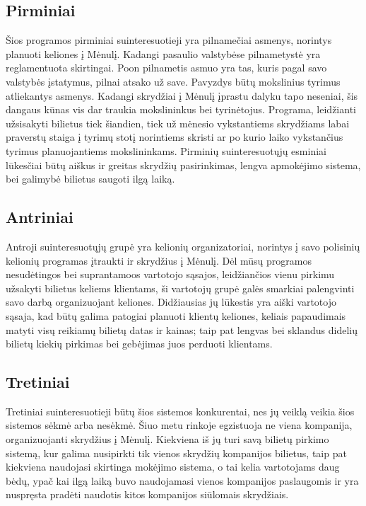 \documentclass{VUMIFPSkursinis}
\begin{document}
\subsection{Pirminiai} Šios programos pirminiai suinteresuotieji yra pilnamečiai asmenys, norintys planuoti keliones į Mėnulį. Kadangi pasaulio valstybėse pilnametystė yra reglamentuota skirtingai. Poon pilnametis asmuo yra tas, kuris pagal savo valstybės įstatymus, pilnai atsako už save. Pavyzdys būtų mokslinius tyrimus atliekantys asmenys. Kadangi skrydžiai į Mėnulį įprastu dalyku tapo neseniai, šis dangaus kūnas vis dar traukia mokslininkus bei tyrinėtojus. Programa, leidžianti užsisakyti bilietus tiek šiandien, tiek už mėnesio vykstantiems skrydžiams labai praverstų staiga į tyrimų stotį norintiems skristi ar po kurio laiko vykstančius tyrimus planuojantiems mokslininkams. Pirminių suinteresuotųjų esminiai lūkesčiai būtų aiškus ir greitas skrydžių pasirinkimas, lengva apmokėjimo sistema, bei galimybė bilietus saugoti ilgą laiką.

\subsection{Antriniai} Antroji suinteresuotųjų grupė yra kelionių organizatoriai, norintys į savo polisinių kelionių programas įtraukti ir skrydžius į Mėnulį. Dėl mūsų programos nesudėtingos bei suprantamoos vartotojo sąsajos, leidžiančios vienu pirkimu užsakyti bilietus keliems klientams, ši vartotojų grupė galės smarkiai palengvinti savo darbą organizuojant keliones. Didžiausias jų lūkestis yra aiški vartotojo sąsaja, kad būtų galima patogiai planuoti klientų keliones, keliais papaudimais matyti visų reikiamų bilietų datas ir kainas; taip pat lengvas bei sklandus didelių bilietų kiekių pirkimas bei gebėjimas juos perduoti klientams.

\subsection{Tretiniai} Tretiniai suinteresuotieji būtų šios sistemos konkurentai, nes jų veiklą veikia šios sistemos sėkmė arba nesėkmė. Šiuo metu rinkoje egzistuoja ne viena kompanija, organizuojanti skrydžius į Mėnulį. Kiekviena iš jų turi savą bilietų pirkimo sistemą, kur galima nusipirkti tik vienos skrydžių kompanijos bilietus, taip pat kiekviena naudojasi skirtinga mokėjimo sistema, o tai kelia vartotojams daug bėdų, ypač kai ilgą laiką buvo naudojamasi vienos kompanijos paslaugomis ir yra nuspręsta pradėti naudotis kitos kompanijos siūlomais skrydžiais. 
\end{document}
